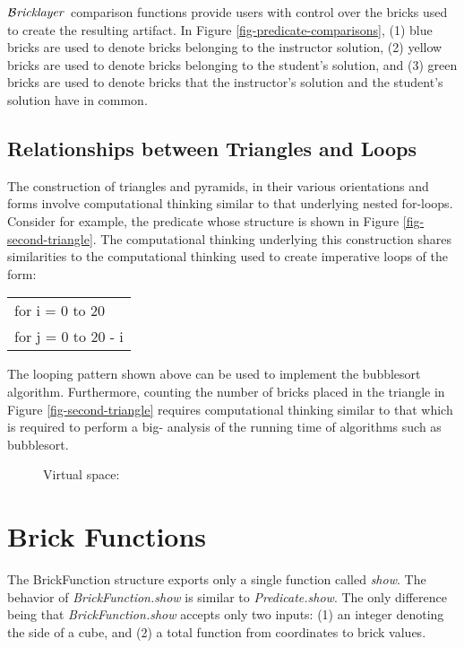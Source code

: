 \documentclass[submission,copyright,creativecommons]{eptcs}
\newcommand{\bricklayer}{\ensuremath{\mathcal{B}\emph{ricklayer}}}
\begin{document}
\bricklayer\ comparison functions provide users with control over the bricks used to create the resulting artifact. In Figure \ref{fig-predicate-comparisons}, (1) blue bricks are used to denote bricks belonging to the instructor solution, (2) yellow bricks are used to denote bricks belonging to the student's solution, and (3) green bricks are used to denote bricks that the instructor's solution and the student's solution have in common.




\subsection{Relationships between Triangles and Loops}
The construction of triangles and pyramids, in their various orientations and forms involve computational thinking similar to that underlying nested for-loops. Consider for example, the predicate  whose structure is shown in Figure \ref{fig-second-triangle}. The computational thinking underlying this construction shares similarities to the computational thinking used to create imperative loops of the form:

\begin{center}
\begin{tabular}{l}
for i = 0 to 20 \\
\qquad  for j = 0 to 20 - i
\end{tabular}
\end{center}

The looping pattern shown above can be used to implement the bubblesort algorithm. Furthermore, counting the number of bricks placed in the triangle in Figure \ref{fig-second-triangle} requires computational thinking similar to that which is required to perform a big- analysis of the running time of algorithms such as bubblesort.


\begin{figure}[htb!]
\centering
{}
\caption{Virtual space: }\label{fig-simplePyramid}
\end{figure}


\section{Brick Functions}\label{section-brick-functions}
The BrickFunction structure exports only a single function called \emph{show}. The behavior of \emph{BrickFunction.show} is similar to \emph{Predicate.show}. The only difference being that \emph{BrickFunction.show} accepts only two inputs: (1) an integer  denoting the side of a cube, and (2) a total function  from  coordinates to brick values.
\end{document}
